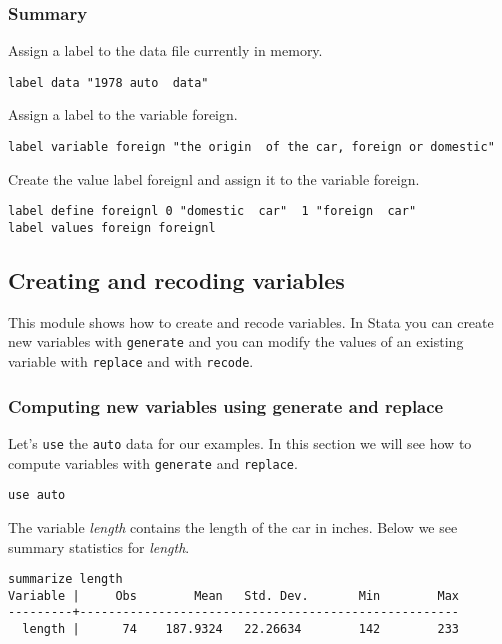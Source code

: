 \subsubsection{Summary}
\begin{compactitem}
\item Assign a label to the data file currently in memory.
\begin{lstlisting}
label data "1978 auto  data"
\end{lstlisting}
\item Assign a label to the variable foreign.
\begin{lstlisting}
label variable foreign "the origin  of the car, foreign or domestic"
\end{lstlisting}
\item Create the value label foreignl and assign it to the variable foreign.
\begin{lstlisting}
label define foreignl 0 "domestic  car"  1 "foreign  car"
label values foreign foreignl
\end{lstlisting}
\end{compactitem}

\subsection{Creating and recoding variables}

This module shows how to create and recode variables. In Stata you can create new variables with \lstinline{generate} and you can modify the values of an existing variable with \lstinline{replace} and with \lstinline{recode}.

\subsubsection{Computing new variables using generate and replace}

Let's \lstinline{use} the \lstinline{auto} data for our examples. In this section we will see how to compute variables with \lstinline{generate} and \lstinline{replace}.

\begin{lstlisting}
use auto
\end{lstlisting}

The variable \textit{length} contains the length of the car in inches. Below we see summary statistics for \textit{length}.

\begin{lstlisting}
summarize length
Variable |     Obs        Mean   Std. Dev.       Min        Max
---------+-----------------------------------------------------
  length |      74    187.9324   22.26634        142        233
\end{lstlisting}

